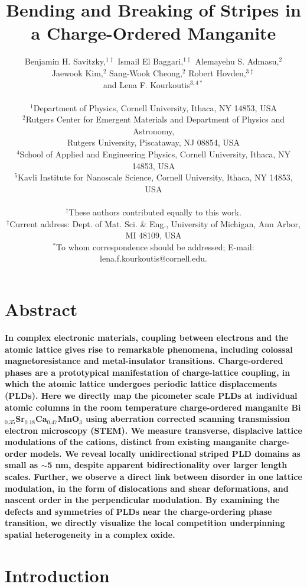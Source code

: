 \documentclass[12pt]{article}
\title{Bending and Breaking of Stripes in a Charge-Ordered Manganite}
\author
{Benjamin H. Savitzky,$^{1\dagger}$ Ismail El Baggari,$^{1\dagger}$ Alemayehu S. Admasu,$^{2}$\\ Jaewook Kim,$^{2}$ Sang-Wook Cheong,$^{2}$ Robert Hovden,$^{3\ddagger}$ \\and Lena F. Kourkoutis$^{3,4\ast}$\\
\\
\normalsize{$^{1}$Department of Physics, Cornell University, Ithaca, NY 14853, USA}\\
\normalsize{$^{2}$Rutgers Center for Emergent Materials and Department of Physics and Astronomy,}\\
\normalsize{Rutgers University, Piscataway, NJ 08854, USA}\\
\normalsize{$^{4}$School of Applied and Engineering Physics, Cornell University, Ithaca, NY 14853, USA}\\
\normalsize{$^{5}$Kavli Institute for Nanoscale Science, Cornell University, Ithaca, NY 14853, USA}\\
\\
\normalsize{$^\dagger$These authors contributed equally to this work.}\\
\normalsize{$^{\ddagger}$Current address: Dept. of Mat. Sci. \& Eng., University of Michigan, Ann Arbor, MI 48109, USA}\\
\normalsize{$^\ast$To whom correspondence should be addressed; E-mail:  lena.f.kourkoutis@cornell.edu.}
}
\date{}
\begin{document}
 

\baselineskip24pt

\maketitle 


\newpage

\section*{Abstract}

\textbf{
In complex electronic materials, coupling between electrons and the atomic lattice gives rise to remarkable phenomena, including colossal magnetoresistance and metal-insulator transitions.
Charge-ordered phases are a prototypical manifestation of charge-lattice coupling, in which the atomic lattice undergoes periodic lattice displacements (PLDs).
Here we directly map the picometer scale PLDs at individual atomic columns in the room temperature charge-ordered manganite Bi$_{0.35}$Sr$_{0.18}$Ca$_{0.47}$MnO$_{3}$ using aberration corrected scanning transmission electron microscopy (STEM).
We measure transverse, displacive lattice modulations of the cations, distinct from existing manganite charge-order models.
We reveal locally unidirectional striped PLD domains as small as $\sim$5 nm, despite apparent bidirectionality over larger length scales.
Further, we observe a direct link between disorder in one lattice modulation, in the form of dislocations and shear deformations, and nascent order in the perpendicular modulation.
By examining the defects and symmetries of PLDs near the charge-ordering phase transition, we directly visualize the local competition underpinning spatial heterogeneity in a complex oxide.
}


\newpage

\section*{Introduction}


\end{document}
